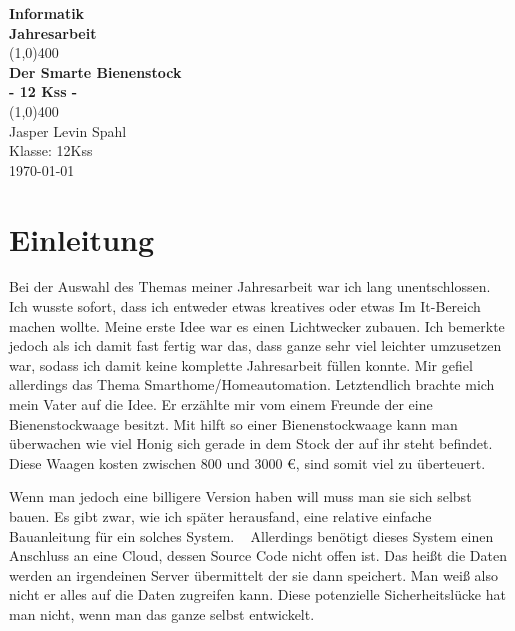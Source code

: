 \documentclass[ngerman,12pt]{scrartcl}
\author{Jasper Levin Spahl}
\begin{document}
\begin{titlepage}
\begin{center}
\vspace*{1cm}

\Large{\textbf{Informatik}}\\
\Large{\textbf{Jahresarbeit}}\\
\vfill
\line(1,0){400}\\[1mm]
\huge{\textbf{Der Smarte Bienenstock}}\\[3mm]
\Large{\textbf{- 12 Kss -}}\\
\line(1,0){400}\\
\vfill
Jasper Levin Spahl\\
Klasse: 12Kss\\
\today\\
\end{center}
\end{titlepage}

\tableofcontents
\thispagestyle{empty}
\clearpage
\setcounter{page}{1}

\section{Einleitung}

Bei der Auswahl des Themas meiner Jahresarbeit war ich lang unentschlossen.
Ich wusste sofort, dass ich entweder etwas kreatives oder etwas Im It-Bereich machen wollte.
Meine erste Idee war es einen Lichtwecker zubauen.
Ich bemerkte jedoch als ich damit fast fertig war das, dass ganze sehr viel leichter umzusetzen war, sodass ich damit keine komplette Jahresarbeit füllen konnte.
Mir gefiel allerdings das Thema Smarthome/Homeautomation.
Letztendlich brachte mich mein Vater auf die Idee.
Er erzählte mir vom einem Freunde der eine Bienenstockwaage besitzt.
Mit hilft so einer Bienenstockwaage kann man überwachen wie viel Honig sich gerade in dem Stock der auf ihr steht befindet.
Diese Waagen kosten zwischen 800 und 3000 \euro{}, sind somit viel zu überteuert.

Wenn man jedoch eine billigere Version haben will muss man sie sich selbst bauen.
Es gibt zwar, wie ich später herausfand, eine relative einfache Bauanleitung für ein solches System.
~\cite{Honeypi}
Allerdings benötigt dieses System einen Anschluss an eine Cloud, dessen Source Code nicht offen ist.
Das heißt die Daten werden an irgendeinen Server übermittelt der sie dann speichert.
Man weiß also nicht er alles auf die Daten zugreifen kann.
Diese potenzielle Sicherheitslücke hat man nicht, wenn man das ganze selbst entwickelt.
\end{document}
